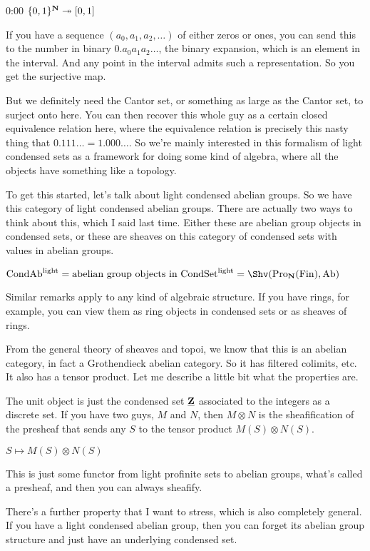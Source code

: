 \begin{unfinished}{0:00}
$\{ 0,1 \}^{\mathbf N} \twoheadrightarrow [0,1]$

If you have a sequence $(a_0, a_1, a_2, \ldots)$ of either zeros or ones, you can send this to the number in binary $0.a_0 a_1 a_2 \ldots$, the binary expansion, which is an element in the interval. And any point in the interval admits such a representation. 
So you get the surjective map.

But we definitely need the Cantor set, or something as large as the Cantor set, to surject onto here. You can then recover this whole guy as a certain closed equivalence relation here, where the equivalence relation is precisely this nasty thing that $0.111\ldots = 1.000\ldots$.
So we're mainly interested in this formalism of light condensed sets as a framework for doing some kind of algebra, where all the objects have something like a topology.

To get this started, let's talk about light condensed abelian groups. So we have this category of light condensed abelian groups. There are actually two ways to think about this, which I said last time. Either these are abelian group objects in condensed sets, or these are sheaves on this category of condensed sets with values in abelian groups. 

$\Cond\Ab^{\light} = \text{abelian group objects in $\Cond\Set^{\light}$} = \Shv(\Pro_{\N}(\Fin),\Ab)$ 

% 
Similar remarks apply to any kind of algebraic structure. If you have rings, for example, you can view them as ring objects in condensed sets or as sheaves of rings.

From the general theory of sheaves and topoi, we know that this is an abelian category, in fact a Grothendieck abelian category. So it has filtered colimits, etc.  
It also has a tensor product. Let me describe a little bit what the properties are.

The unit object is just the condensed set $\underline{\mathbf Z}$ associated to the integers as a discrete set. If you have two guys,  $M$ and $N$, then $M\otimes N$ is the sheafification of the presheaf that sends any $S$ to the tensor product $M(S)\otimes N(S)$. 

$S \mapsto M(S)\otimes N(S)$

This is just some functor from light profinite sets to abelian groups, what's called a presheaf, and then you can always sheafify.

There's a further property that I want to stress, which is also completely general. If you have a light condensed abelian group, then you can forget its abelian group structure and just have an underlying condensed set. 


\end{unfinished}
